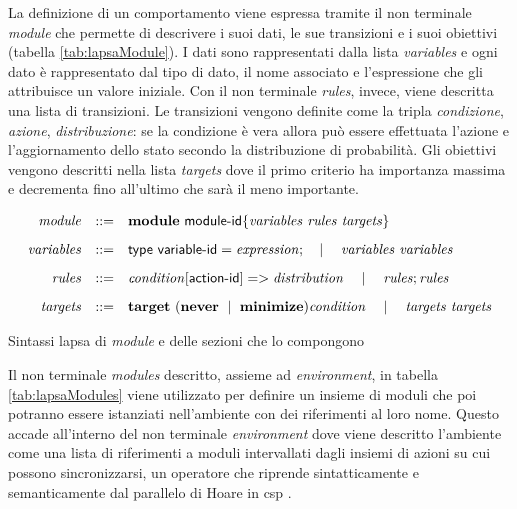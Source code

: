 La definizione di un comportamento viene espressa tramite il non terminale \emph{module} che permette di descrivere i suoi dati, le sue transizioni e i suoi obiettivi (tabella \ref{tab:lapsaModule}). I dati sono rappresentati dalla lista \emph{variables} e ogni dato è rappresentato dal tipo di dato, il nome associato e l'espressione che gli attribuisce un valore iniziale. Con il non terminale \emph{rules}, invece, viene descritta una lista di transizioni. Le transizioni vengono definite come la tripla \emph{condizione}, \emph{azione}, \emph{distribuzione}: se la condizione è vera allora può essere effettuata l'azione e l'aggiornamento dello stato secondo la distribuzione di probabilità. Gli obiettivi vengono descritti nella lista \emph{targets} dove il primo criterio ha importanza massima e decrementa fino all'ultimo che sarà il meno importante.

\begin{table}[htbp!] %
$$
\begin{array}{rcl}
	\mathit{module} &::=& \mathbf{module} \mbox{ } {\sf module}\textrm{-}{\sf id} \{ \mathit{variables} \mbox{ } \mathit{rules} \mbox{ } \mathit{targets} \}
		\\[.3cm]
	\mathit{variables} &::=& {\sf type} \mbox{ } {\sf variable}\textrm{-}{\sf id} = \mathit{expression}; \quad\mid\quad \mathit{variables} \mbox{ } \mathit{variables}
		\\[.3cm]
	\mathit{rules} &::=& \mathit{condition} [ {\sf action}\textrm{-}{\sf id}] => \mathit{distribution} \quad\mid\quad \mathit{rules};\mathit{rules}
		\\[.3cm]
	\mathit{targets} &::=& \mathbf{target} \mbox{ } (\mathbf{never} \mbox{ }\mid\mbox{ } \mathbf{minimize}) \mathit{condition} \quad\mid\quad \mathit{targets} \mbox{ } \mathit{targets} \\
\end{array}
$$
\caption{Sintassi \ac{lapsa} di \emph{module} e delle sezioni che lo compongono}
\label{tab:lapsaModule}
\end{table}

Il non terminale \emph{modules} descritto, assieme ad \emph{environment}, in tabella \ref{tab:lapsaModules} viene utilizzato per definire un insieme di moduli che poi potranno essere istanziati nell'ambiente con dei riferimenti al loro nome. Questo accade all'interno del non terminale \emph{environment} dove viene descritto l'ambiente come una lista di riferimenti a moduli intervallati dagli insiemi di azioni su cui possono sincronizzarsi, un operatore che riprende sintatticamente e semanticamente dal parallelo di Hoare in \ac{csp} \cite{Hoare:1978:CSP}.

